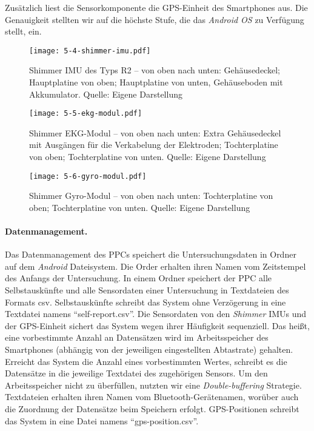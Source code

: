 Zusätzlich liest die Sensorkomponente die \ac{GPS}-Einheit des Smartphones aus. Die Genauigkeit stellten wir auf die höchste Stufe, die das \emph{Android OS} zu Verfügung stellt, ein.

\begin{figure}[t]
	\centering
		\texttt{[image: 5-4-shimmer-imu.pdf]}
	\caption[Shimmer IMU des Typs R2]{Shimmer IMU des Typs R2 -- von oben nach unten: Gehäusedeckel; Hauptplatine von oben; Hauptplatine von unten, Gehäuseboden mit Akkumulator. Quelle: Eigene Darstellung}
	\label{fig:5_4_shimmer_imu}
\end{figure}

\begin{figure}[t]
	\centering
		\texttt{[image: 5-5-ekg-modul.pdf]}
	\caption[Shimmer EKG-Modul]{Shimmer EKG-Modul -- von oben nach unten: Extra Gehäusedeckel mit Ausgängen für die Verkabelung der Elektroden; Tochterplatine von oben; Tochterplatine von unten. Quelle: Eigene Darstellung}
	\label{fig:5_5_ekg_modul}
\end{figure}

\begin{figure}[t]
	\centering
		\texttt{[image: 5-6-gyro-modul.pdf]}
	\caption[Shimmer Gyro-Modul]{Shimmer Gyro-Modul -- von oben nach unten: Tochterplatine von oben; Tochterplatine von unten. Quelle: Eigene Darstellung}
	\label{fig:5_6_gyro_modul}
\end{figure}

\paragraph{Datenmanagement.}
Das Datenmanagement des \ac{PPC}s speichert die Untersuchungsdaten in Ordner auf dem \emph{Android} Dateisystem. Die Order erhalten ihren Namen vom Zeitstempel des Anfangs der Untersuchung. In einem Ordner speichert der \ac{PPC} alle Selbstauskünfte und alle Sensordaten einer Untersuchung in Textdateien des Formats \acs{csv}. Selbstauskünfte schreibt das System ohne Verzögerung in eine Textdatei namens "`self-report.csv"'. Die Sensordaten von den \emph{Shimmer} \acp{IMU} und der \ac{GPS}-Einheit sichert das System wegen ihrer Häufigkeit sequenziell. Das heißt, eine vorbestimmte Anzahl an Datensätzen wird im Arbeitsspeicher des Smartphones (abhängig von der jeweiligen eingestellten Abtastrate) gehalten. Erreicht das System die Anzahl eines vorbestimmten Wertes, schreibt es die Datensätze in die jeweilige Textdatei des zugehörigen Sensors. Um den Arbeitsspeicher nicht zu überfüllen, nutzten wir eine \emph{Double-buffering} Strategie. Textdateien erhalten ihren Namen vom Bluetooth-Gerätenamen, worüber auch die Zuordnung der Datensätze beim Speichern erfolgt. \ac{GPS}-Positionen schreibt das System in eine Datei namens "`gps-position.csv"'.

